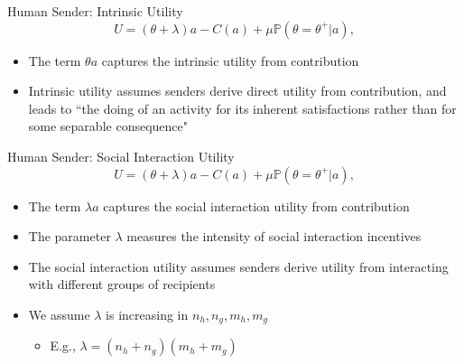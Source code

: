 \documentclass[9pt]{beamer}
\begin{document}
\begin{frame}{Human Sender: Intrinsic Utility}
\begin{equation*}
    U = (\theta + \lambda )a - C(a) + \mu \mathbb{P}(\theta=\theta^+|a),
\end{equation*}
\vspace{.5em}
\begin{itemize}\setlength{\itemsep}{1em}
    \item The term $\theta a$ captures the intrinsic utility from contribution
    \item Intrinsic utility assumes senders derive direct utility from contribution, and leads to ``the doing of an activity for its inherent satisfactions rather than for some separable consequence"
\end{itemize}
\end{frame}


\begin{frame}{Human Sender: Social Interaction Utility}
\begin{equation*}
    U = (\theta + \lambda )a - C(a) + \mu \mathbb{P}(\theta=\theta^+|a),
\end{equation*}
\vspace{.5em}

\begin{itemize}\setlength{\itemsep}{1em}
    \item The term $\lambda a$ captures the social interaction utility from contribution
    \item The parameter $\lambda$ measures the intensity of social interaction incentives
    \item The social interaction utility assumes senders derive utility from interacting with different groups of recipients 
    \item We assume $\lambda$ is increasing in $n_h,n_g,m_h,m_g$
    \vspace{.5em}
    \begin{itemize}
        \item E.g., $\lambda = (n_h+n_g)(m_h+m_g)$
    \end{itemize}
\end{itemize}
\end{frame}
\end{document}
